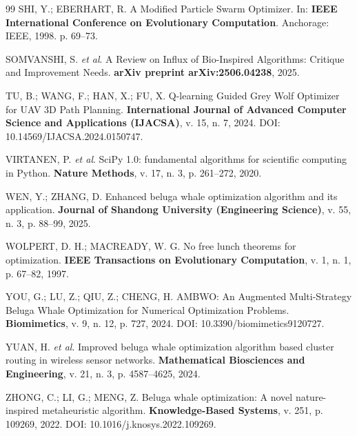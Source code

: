 \documentclass[12pt, a4paper, oneside]{report}
\begin{document}
\begin{flushleft}
\begin{thebibliography}{99}
SHI, Y.; EBERHART, R. A Modified Particle Swarm Optimizer. In: \textbf{IEEE International Conference on Evolutionary Computation}. Anchorage: IEEE, 1998. p. 69--73.

SOMVANSHI, S. \textit{et al}. A Review on Influx of Bio-Inspired Algorithms: Critique and Improvement Needs. \textbf{arXiv preprint arXiv:2506.04238}, 2025.

TU, B.; WANG, F.; HAN, X.; FU, X. Q-learning Guided Grey Wolf Optimizer for UAV 3D Path Planning. \textbf{International Journal of Advanced Computer Science and Applications (IJACSA)}, v. 15, n. 7, 2024. DOI: 10.14569/IJACSA.2024.0150747.

VIRTANEN, P. \textit{et al}. SciPy 1.0: fundamental algorithms for scientific computing in Python. \textbf{Nature Methods}, v. 17, n. 3, p. 261--272, 2020.

WEN, Y.; ZHANG, D. Enhanced beluga whale optimization algorithm and its application. \textbf{Journal of Shandong University (Engineering Science)}, v. 55, n. 3, p. 88--99, 2025.

WOLPERT, D. H.; MACREADY, W. G. No free lunch theorems for optimization. \textbf{IEEE Transactions on Evolutionary Computation}, v. 1, n. 1, p. 67--82, 1997.

YOU, G.; LU, Z.; QIU, Z.; CHENG, H. AMBWO: An Augmented Multi-Strategy Beluga Whale Optimization for Numerical Optimization Problems. \textbf{Biomimetics}, v. 9, n. 12, p. 727, 2024. DOI: 10.3390/biomimetics9120727.

YUAN, H. \textit{et al}. Improved beluga whale optimization algorithm based cluster routing in wireless sensor networks. \textbf{Mathematical Biosciences and Engineering}, v. 21, n. 3, p. 4587--4625, 2024.

ZHONG, C.; LI, G.; MENG, Z. Beluga whale optimization: A novel nature-inspired metaheuristic algorithm. \textbf{Knowledge-Based Systems}, v. 251, p. 109269, 2022. DOI: 10.1016/j.knosys.2022.109269.

\end{thebibliography}
\end{flushleft}
\end{document}

